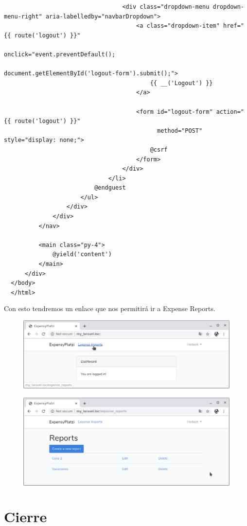 \documentclass{article}
\begin{document}
\begin{verbatim}
                                  <div class="dropdown-menu dropdown-menu-right" aria-labelledby="navbarDropdown">
                                      <a class="dropdown-item" href="{{ route('logout') }}"
                                        onclick="event.preventDefault();
                                        document.getElementById('logout-form').submit();">
                                          {{ __('Logout') }}
                                      </a>

                                      <form id="logout-form" action="{{ route('logout') }}"
                                            method="POST" style="display: none;">
                                          @csrf
                                      </form>
                                  </div>
                              </li>
                          @endguest
                      </ul>
                  </div>
              </div>
          </nav>

          <main class="py-4">
              @yield('content')
          </main>
      </div>
  </body>
  </html>
\end{verbatim}

Con esto tendremos un enlace que nos permitirá ir a Expense Reports.

\begin{figure}[h!]
  \centering
  \includegraphics[scale=0.5]{./Pictures/140_expense_reports_link.png}
\end{figure}

\begin{figure}[h!]
  \centering
  \includegraphics[scale=0.5]{./Pictures/141_expense_reports_link_ok.png}
\end{figure}

\section{Cierre}%
\end{document}
